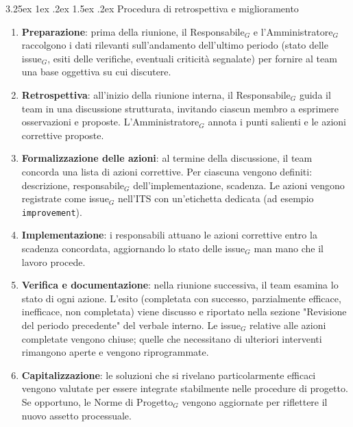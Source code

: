 \documentclass[a4paper, 10pt]{article}
\makeatletter
\renewcommand\paragraph{\@startsection{paragraph}{4}{\z@}%
  {3.25ex \@plus1ex \@minus .2ex}%
  {1.5ex \@plus .2ex}%
  {\normalfont\normalsize\bfseries}}
\makeatother
\begin{document}
\paragraph{Procedura di retrospettiva e miglioramento}

\begin{enumerate}
    \item \textbf{Preparazione}: prima della riunione, il Responsabile$_G$ e l'Amministratore$_G$ raccolgono i dati rilevanti sull'andamento dell'ultimo periodo (stato delle issue$_G$, esiti delle verifiche, eventuali criticità segnalate) per fornire al team una base oggettiva su cui discutere.
    
    \item \textbf{Retrospettiva}: all'inizio della riunione interna, il Responsabile$_G$ guida il team in una discussione strutturata, invitando ciascun membro a esprimere osservazioni e proposte. L'Amministratore$_G$ annota i punti salienti e le azioni correttive proposte.
    
    \item \textbf{Formalizzazione delle azioni}: al termine della discussione, il team concorda una lista di azioni correttive. Per ciascuna vengono definiti: descrizione, responsabile$_G$ dell'implementazione, scadenza. Le azioni vengono registrate come issue$_G$ nell'ITS con un'etichetta dedicata (ad esempio \texttt{improvement}).
    
    \item \textbf{Implementazione}: i responsabili attuano le azioni correttive entro la scadenza concordata, aggiornando lo stato delle issue$_G$ man mano che il lavoro procede.
    
    \item \textbf{Verifica e documentazione}: nella riunione successiva, il team esamina lo stato di ogni azione. L'esito (completata con successo, parzialmente efficace, inefficace, non completata) viene discusso e riportato nella sezione "Revisione del periodo precedente" del verbale interno. Le issue$_G$ relative alle azioni completate vengono chiuse; quelle che necessitano di ulteriori interventi rimangono aperte e vengono riprogrammate.
    
    \item \textbf{Capitalizzazione}: le soluzioni che si rivelano particolarmente efficaci vengono valutate per essere integrate stabilmente nelle procedure di progetto. Se opportuno, le Norme di Progetto$_G$ vengono aggiornate per riflettere il nuovo assetto processuale.
\end{enumerate}
\end{document}
